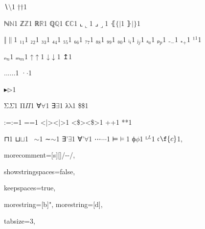 {{∖}{{\ensuremath{\setminus}}}1
{†}{{\ensuremath{\dag}}}1

{ℕ}{{\ensuremath{\mathbb{N}}}}1
{ℤ}{{\ensuremath{\mathbb{Z}}}}1
{ℝ}{{\ensuremath{\mathbb{R}}}}1
{ℚ}{{\ensuremath{\mathbb{Q}}}}1
{ℂ}{{\ensuremath{\mathbb{C}}}}1
{⌞}{{\ensuremath{\llcorner}}}1
{⌟}{{\ensuremath{\lrcorner}}}1
{⦃}{{\ensuremath{\{\!|}}}1
{⦄}{{\ensuremath{|\!\}}}}1

{‖}{{\ensuremath{\|}}}1
{₁}{{\ensuremath{_1}}}1
{₂}{{\ensuremath{_2}}}1
{₃}{{\ensuremath{_3}}}1
{₄}{{\ensuremath{_4}}}1
{₅}{{\ensuremath{_5}}}1
{₆}{{\ensuremath{_6}}}1
{₇}{{\ensuremath{_7}}}1
{₈}{{\ensuremath{_8}}}1
{₉}{{\ensuremath{_9}}}1
{₀}{{\ensuremath{_0}}}1
{ᵢ}{{\ensuremath{_i}}}1
{ⱼ}{{\ensuremath{_j}}}1
{ₐ}{{\ensuremath{_a}}}1
{ₚ}{{\ensuremath{_p}}}1
{₋}{{\ensuremath{_-}}}1
{₊}{{\ensuremath{_+}}}1
{¹}{{\ensuremath{^1}}}1

{ₙ}{{\ensuremath{_n}}}1
{ₘ}{{\ensuremath{_m}}}1
{↑}{{\ensuremath{\uparrow}}}1
{↓}{{\ensuremath{\downarrow}}}1
{↥}{{\ensuremath{}}}1

{...}{{\ensuremath{\ldots}}}1
{·}{{\ensuremath{\cdot}}}1

{▸}{{\ensuremath{\triangleright}}}1

{Σ}{{\color{symbolcolor}\ensuremath{\Sigma}}}1
{Π}{{\color{symbolcolor}\ensuremath{\Pi}}}1
{∀}{{\ensuremath{\forall}}}1
{∃}{{\ensuremath{\exists}}}1
{λ}{{\color{symbolcolor}\ensuremath{\mathrm{\lambda}}}}1
{\$}{{\color{symbolcolor}\$}}1

{:=}{{\color{symbolcolor}:=}}1
{=}{{\color{symbolcolor}=}}1
{<|>}{{\color{symbolcolor}<|>}}1
{<\$>}{{\color{symbolcolor}<\$>}}1
{+}{{\color{symbolcolor}+}}1
{*}{{\color{symbolcolor}*}}1

{⊓}{\color{symbolcolor}{\ensuremath{\sqcap}}}1
{⊔}{\ensuremath{\sqcup}}1
{~}{\ensuremath{\sim}}1
{∼}{\ensuremath{\sim}}1
{∃'}{\ensuremath{\exists}\textquotesingle}1
{∀'}{\ensuremath{\forall}\textquotesingle}1
{⋯}{\ensuremath{\cdots}}1
{⊨}{\ensuremath{\vDash}}1
{ϕ}{\ensuremath{\phi}}1
{ᴸ}{\ensuremath{^{L}}}1
{𝔠}{\ensuremath{\f{c}}}1,

morecomment=[s][\color{commentcolor}]{/-}{-/},

showstringspaces=false,

keepspaces=true,

morestring=[b]",
morestring=[d],

tabsize=3,

}
